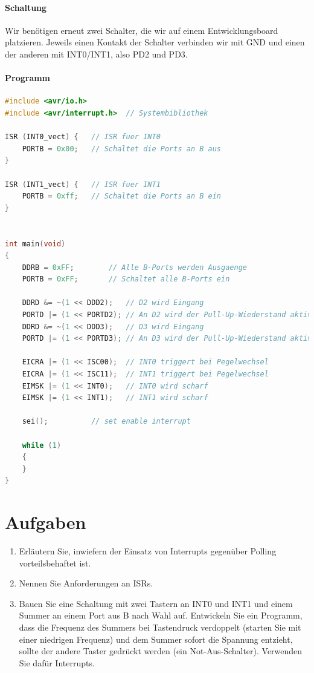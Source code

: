 \documentclass[11pt,a4paper]{scrartcl}
\begin{document}
\paragraph{Schaltung}
Wir benötigen erneut zwei Schalter, die wir auf einem Entwicklungsboard platzieren. Jeweils einen Kontakt der Schalter verbinden wir mit GND und einen der anderen mit INT0/INT1, also PD2 und PD3.
\paragraph{Programm}\quad
\begin{lstlisting}[language=C]
#include <avr/io.h>
#include <avr/interrupt.h>	// Systembibliothek

ISR (INT0_vect) {	// ISR fuer INT0
	PORTB = 0x00;	// Schaltet die Ports an B aus
}			

ISR (INT1_vect) {	// ISR fuer INT1
	PORTB = 0xff;	// Schaltet die Ports an B ein
}


int main(void)
{
	DDRB = 0xFF;		// Alle B-Ports werden Ausgaenge
	PORTB = 0xFF;		// Schaltet alle B-Ports ein 
	
	DDRD &= ~(1 << DDD2); 	// D2 wird Eingang
	PORTD |= (1 << PORTD2);	// An D2 wird der Pull-Up-Wiederstand aktiviert
	DDRD &= ~(1 << DDD3);	// D3 wird Eingang
	PORTD |= (1 << PORTD3);	// An D3 wird der Pull-Up-Wiederstand aktiviert
	
	EICRA |= (1 << ISC00);	// INT0 triggert bei Pegelwechsel
	EICRA |= (1 << ISC11);	// INT1 triggert bei Pegelwechsel
	EIMSK |= (1 << INT0);	// INT0 wird scharf
	EIMSK |= (1 << INT1);	// INT1 wird scharf
	
	sei();			// set enable interrupt
	
    while (1) 
    {
    }
}
\end{lstlisting}
\section*{Aufgaben}
\begin{enumerate}
\item Erläutern Sie, inwiefern der Einsatz von Interrupts gegenüber Polling vorteilsbehaftet ist.
\item Nennen Sie Anforderungen an ISRs.
\item Bauen Sie eine Schaltung mit zwei Tastern an INT0 und INT1 und einem Summer an einem Port aus B nach Wahl auf. Entwickeln Sie ein Programm, dass die Frequenz des Summers bei Tastendruck verdoppelt (starten Sie mit einer niedrigen Frequenz) und dem Summer sofort die Spannung entzieht, sollte der andere Taster gedrückt werden (ein Not-Aus-Schalter). Verwenden Sie dafür Interrupts.
\end{enumerate}
\pagebreak
\end{document}

